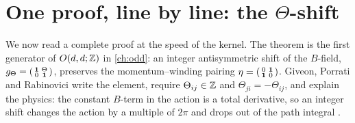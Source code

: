 \section{One proof, line by line: the \texorpdfstring{$\Theta$}{Theta}-shift}
\label{sec:leanprimer:walkthrough}

We now read a complete proof at the speed of the kernel. The theorem is the first
generator of $O(d,d;\mathbb{Z})$ in \cref{ch:odd}: an integer antisymmetric shift of the
$B$-field, $g_\Theta = \begin{psmallmatrix}\mathbf 1&\Theta\\0&\mathbf 1\end{psmallmatrix}$,
preserves the momentum--winding pairing $\eta=\begin{psmallmatrix}0&\mathbf 1\\\mathbf 1&0\end{psmallmatrix}$.
Giveon, Porrati and Rabinovici write the element, require $\Theta_{ij}\in\mathbb{Z}$ and
$\Theta_{ji}=-\Theta_{ij}$, and explain the physics: the constant $B$-term in the action is
a total derivative, so an integer shift changes the action by a multiple of $2\pi$ and drops
out of the path integral .

